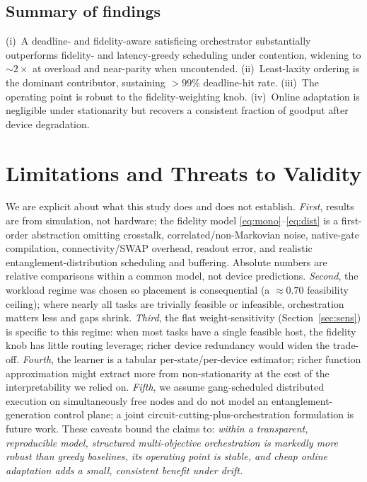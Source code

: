 \documentclass[conference]{IEEEtran}
\begin{document}
\subsection{Summary of findings}
(i)~A deadline- and fidelity-aware satisficing orchestrator substantially
outperforms fidelity- and latency-greedy scheduling under contention, widening to
$\sim\!2\times$ at overload and near-parity when uncontended.
(ii)~Least-laxity ordering is the dominant contributor, sustaining $>\!99\%$
deadline-hit rate. (iii)~The operating point is robust to the fidelity-weighting
knob. (iv)~Online adaptation is negligible under stationarity but recovers a
consistent fraction of goodput after device degradation.

\section{Limitations and Threats to Validity}
\label{sec:limitations}
We are explicit about what this study does and does not establish.
\emph{First}, results are from simulation, not hardware; the fidelity model
\eqref{eq:mono}--\eqref{eq:dist} is a first-order abstraction omitting crosstalk,
correlated/non-Markovian noise, native-gate compilation, connectivity/SWAP
overhead, readout error, and realistic entanglement-distribution scheduling and
buffering. Absolute numbers are relative comparisons within a common model, not
device predictions. \emph{Second}, the workload regime was chosen so placement is
consequential (a $\approx\!0.70$ feasibility ceiling); where nearly all tasks are
trivially feasible or infeasible, orchestration matters less and gaps shrink.
\emph{Third}, the flat weight-sensitivity (Section~\ref{sec:sens}) is specific to
this regime: when most tasks have a single feasible host, the fidelity knob has
little routing leverage; richer device redundancy would widen the trade-off.
\emph{Fourth}, the learner is a tabular per-state/per-device estimator; richer
function approximation might extract more from non-stationarity at the cost of the
interpretability we relied on. \emph{Fifth}, we assume gang-scheduled distributed
execution on simultaneously free nodes and do not model an entanglement-generation
control plane; a joint circuit-cutting-plus-orchestration formulation is future
work. These caveats bound the claims to: \emph{within a transparent, reproducible
model, structured multi-objective orchestration is markedly more robust than
greedy baselines, its operating point is stable, and cheap online adaptation adds
a small, consistent benefit under drift.}
\end{document}
